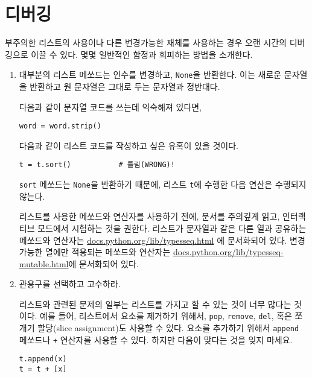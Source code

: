 \section{디버깅}

부주의한 리스트의 사용이나 다른 변경가능한 재체를 사용하는 경우 오랜 시간의 디버깅으로 이끌 수 있다. 몇몇 일반적인 함정과 회피하는 방법을 소개한다.

\begin{enumerate}

\item 대부분의 리스트 메쏘드는 인수를 변경하고, {\tt None}을 반환한다. 이는 새로운 문자열을 반환하고 원 문자열은 그대로 두는 문자열과 정반대다.

다음과 같이 문자열 코드를 쓰는데 익숙해져 있다면,

\beforeverb
\begin{verbatim}
word = word.strip()
\end{verbatim}
\afterverb

다음과 같이 리스트 코드를 작성하고 싶은 유혹이 있을 것이다.

\beforeverb
\begin{verbatim}
t = t.sort()           # 틀림(WRONG)!
\end{verbatim}
\afterverb


{\tt sort} 메쏘드는 {\tt None}을 반환하기 때문에, 리스트 {\tt t}에 수행한 다음 연산은 수행되지 않는다.

리스트를 사용한 메쏘드와 연산자를 사용하기 전에, 문서를 주의깊게 읽고, 인터랙티브 모드에서 시험하는 것을 권한다.
리스트가 문자열과 같은 다른 열과 공유하는 메쏘드와 연산자는 \url{docs.python.org/lib/typesseq.html} 에 문서화되어 있다.
변경가능한 열에만 적용되는 메쏘드와 연산자는 \url{docs.python.org/lib/typesseq-mutable.html}에 문서화되어 있다.



\item 관용구를 선택하고 고수하라.

리스트와 관련된 문제의 일부는 리스트를 가지고 할 수 있는 것이 너무 많다는 것이다.
예를 들어, 리스트에서 요소를 제거하기 위해서, {\tt pop}, {\tt remove}, {\tt del}, 혹은 쪼개기 할당(slice assignment)도 사용할 수 있다.
요소를 추가하기 위해서 {\tt append} 메쏘드나 {\tt +} 연산자를 사용할 수 있다. 하지만 다음이 맞다는 것을 잊지 마세요.

\beforeverb
\begin{verbatim}
t.append(x)
t = t + [x]
\end{verbatim}
\afterverb


\end{enumerate}
